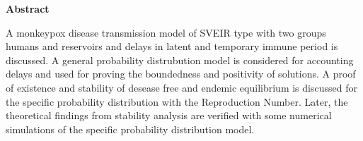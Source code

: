 
\begin{center}\textbf{Abstract}\end{center}


A monkeypox disease transmission model of SVEIR type with two groups humans and reservoirs and delays in latent and temporary immune period is discussed. A general probability distrubution model is considered for accounting delays and used for proving the boundedness and positivity of solutions. A proof of existence and stability of desease free and endemic equilibrium is discussed for the specific probability distribution with the Reproduction Number. Later, the theoretical findings from stability analysis are verified with some numerical simulations of the specific probability distribution model.


\cleardoublepage
